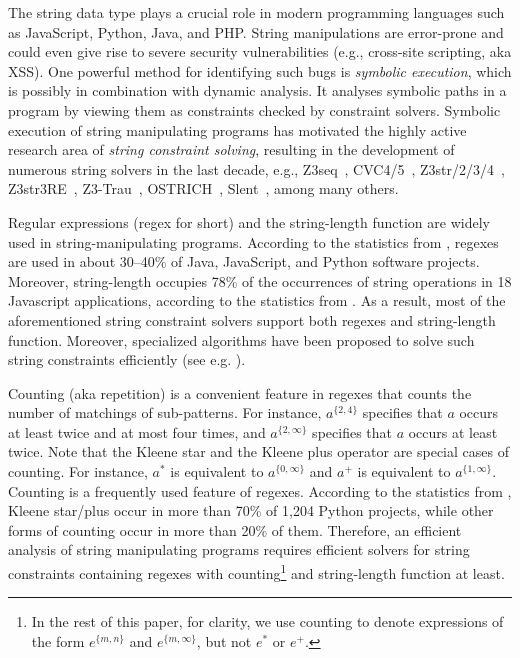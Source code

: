 The string data type plays a crucial role in modern programming languages such as JavaScript, Python, Java, and PHP. 
String manipulations are error-prone and could even give rise to severe security vulnerabilities (e.g., cross-site scripting, aka XSS). 
One powerful method for identifying such bugs is \emph{symbolic execution}, which is possibly in combination with dynamic analysis. It analyses symbolic paths in a program by viewing them as constraints checked by constraint solvers. 
%
Symbolic execution of string manipulating programs has motivated the highly active research area of \emph{string constraint solving}, resulting in the development of numerous string solvers in the last decade, e.g.,
Z3seq~\cite{z3seq}, CVC4/5~\cite{cvc4,cvc5}, Z3str/2/3/4~\cite{Z3-str,Z3-str2,Z3-str3,BerzishMurphy2021}, Z3str3RE~\cite{BD+23}, 
Z3-Trau~\cite{Z3-trau}\cite{z3trau}, OSTRICH~\cite{CHL+19}, Slent~\cite{WC+18}, among many others. 

Regular expressions (regex for short) and the string-length function are widely used in string-manipulating programs. According to the statistics from \cite{CS16,DCSL18,WS18}, regexes are used in about 30–40\% of Java, JavaScript, and Python software projects. 
Moreover, string-length occupies 78\% of the occurrences of string operations in 18 Javascript applications, according to the statistics from \cite{malware_detection_3_kudzu}. 
As a result, most of the aforementioned string constraint solvers support both regexes and string-length function. Moreover, specialized algorithms have been proposed to solve such string constraints efficiently (see e.g. \cite{LTR+15,BD+23}). 

Counting (aka repetition) is a convenient feature in regexes that counts the number of matchings of sub-patterns. For instance, $a^{\{2, 4\}}$ specifies that $a$ occurs at least twice and at most four times, and $a^{\{2, \infty\}}$ specifies that $a$ occurs at least twice. 
Note that the Kleene star and the Kleene plus operator are special cases of counting. For instance, $a^*$ is equivalent to $a^{\{0,\infty\}}$ and $a^+$ is equivalent to $a^{\{1,\infty\}}$.
Counting is a frequently used feature of regexes. According to the statistics from \cite{CS16}, Kleene star/plus occur in more than 70\% of 1,204 Python projects, while other forms of counting occur in more than 20\% of them. Therefore, an efficient analysis of string manipulating programs requires efficient solvers for string constraints containing regexes with counting\footnote{In the rest of this paper, for clarity, we use counting to denote expressions of the form $e^{\{m, n\}}$ and  $e^{\{m, \infty\}}$, but not $e^*$ or $e^+$.} and string-length function at least. 

